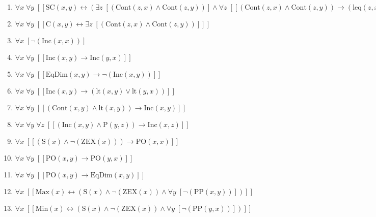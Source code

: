 \documentclass{article}
\begin{document}
\begin{enumerate}
\item $\forall x\; \forall y\;  \left[ \left[ \textrm{SC}(x,y) \leftrightarrow \left(\exists z\;  \left[ \left(\textrm{Cont}(z,x) \land \textrm{Cont}(z,y)\right) \right] \land \forall z\;  \left[ \left[ \left(\textrm{Cont}(z,x) \land \textrm{Cont}(z,y)\right) \rightarrow \left(\textrm{leq}(z,x) \land \neg \left(\textrm{EqDim}(z,x)\right) \land \textrm{leq}(z,y) \land \neg \left(\textrm{EqDim}(z,y)\right)\right) \right] \right]\right) \right] \right]$
\item $\forall x\; \forall y\;  \left[ \left[ \textrm{C}(x,y) \leftrightarrow \exists z\;  \left[ \left(\textrm{Cont}(z,x) \land \textrm{Cont}(z,y)\right) \right] \right] \right]$
\item $\forall x\;  \left[ \neg \left(\textrm{Inc}(x,x)\right) \right]$
\item $\forall x\; \forall y\;  \left[ \left[ \textrm{Inc}(x,y) \rightarrow \textrm{Inc}(y,x) \right] \right]$
\item $\forall x\; \forall y\;  \left[ \left[ \textrm{EqDim}(x,y) \rightarrow \neg \left(\textrm{Inc}(x,y)\right) \right] \right]$
\item $\forall x\; \forall y\;  \left[ \left[ \textrm{Inc}(x,y) \rightarrow \left(\textrm{lt}(x,y) \lor \textrm{lt}(y,x)\right) \right] \right]$
\item $\forall x\; \forall y\;  \left[ \left[ \left(\textrm{Cont}(x,y) \land \textrm{lt}(x,y)\right) \rightarrow \textrm{Inc}(x,y) \right] \right]$
\item $\forall x\; \forall y\; \forall z\;  \left[ \left[ \left(\textrm{Inc}(x,y) \land \textrm{P}(y,z)\right) \rightarrow \textrm{Inc}(x,z) \right] \right]$
\item $\forall x\;  \left[ \left[ \left(\textrm{S}(x) \land \neg \left(\textrm{ZEX}(x)\right)\right) \rightarrow \textrm{PO}(x,x) \right] \right]$
\item $\forall x\; \forall y\;  \left[ \left[ \textrm{PO}(x,y) \rightarrow \textrm{PO}(y,x) \right] \right]$
\item $\forall x\; \forall y\;  \left[ \left[ \textrm{PO}(x,y) \rightarrow \textrm{EqDim}(x,y) \right] \right]$
\item $\forall x\;  \left[ \left[ \textrm{Max}(x) \leftrightarrow \left(\textrm{S}(x) \land \neg \left(\textrm{ZEX}(x)\right) \land \forall y\;  \left[ \neg \left(\textrm{PP}(x,y)\right) \right]\right) \right] \right]$
\item $\forall x\;  \left[ \left[ \textrm{Min}(x) \leftrightarrow \left(\textrm{S}(x) \land \neg \left(\textrm{ZEX}(x)\right) \land \forall y\;  \left[ \neg \left(\textrm{PP}(y,x)\right) \right]\right) \right] \right]$

\end{enumerate}
\end{document}
